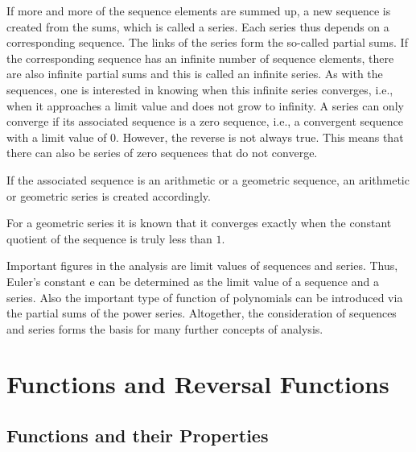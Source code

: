 \documentclass{book}
\begin{document}
If more and more of the sequence elements are summed up, a new sequence is created from the sums, which is called a series. Each series thus depends on a corresponding sequence. The links of the series form the so-called partial sums. If the corresponding sequence has an infinite number of sequence elements, there are also infinite partial sums and this is called an infinite series. As with the sequences, one is interested in knowing when this infinite series converges, i.e., when it approaches a limit value and does not grow to infinity. A series can only converge if its associated sequence is a zero sequence, i.e., a convergent sequence with a limit value of $0$. However, the reverse is not always true. This means that there can also be series of zero sequences that do not converge.

If the associated sequence is an arithmetic or a geometric sequence, an arithmetic or geometric series is created accordingly.

For a geometric series it is known that it converges exactly when the constant quotient of the sequence is truly less than $1$.

Important figures in the analysis are limit values of sequences and series. Thus, Euler's constant e can be determined as the limit value of a sequence and a series. Also the important type of function of polynomials can be introduced via the partial sums of the power series. Altogether, the consideration of sequences and series forms the basis for many further concepts of analysis.

\chapter{Functions and Reversal Functions}
\section{Functions and their Properties}
\end{document}
